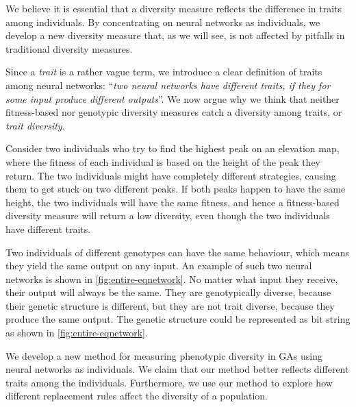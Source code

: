 We believe it is essential that a diversity measure reflects the difference in traits among individuals. By concentrating on neural networks as individuals, we develop a new diversity measure that, as we will see, is not affected by pitfalls in traditional diversity measures.

Since a \emph{trait} is a rather vague term, we introduce a clear definition of traits among neural networks: ``\emph{two neural networks have different traits, if they for some input produce different outputs}''. We now argue why we think that neither fitness-based nor genotypic diversity measures catch a diversity among traits, or \emph{trait diversity}.

Consider two individuals who try to find the highest peak on an elevation map, where the fitness of each individual is based on the height of the peak they return. The two individuals might have completely different strategies, causing them to get stuck on two different peaks. If both peaks happen to have the same height, the two individuals will have the same fitness, and hence a fitness-based diversity measure will return a low diversity, even though the two individuals have different traits.

Two individuals of different genotypes can have the same behaviour, which means they yield the same output on any input. An example of such two neural networks is shown in \cref{fig:entire-eqnetwork}. No matter what input they receive, their output will always be the same. They are genotypically diverse, because their genetic structure is different, but they are not trait diverse, because they produce the same output. The genetic structure could be represented as bit string as shown in \cref{fig:entire-eqnetwork}.
%

%
We develop a new method for measuring phenotypic diversity in GAs using neural networks as individuals. We claim that our method better reflects different traits among the individuals. Furthermore, we use our method to explore how different replacement rules affect the diversity of a population.

